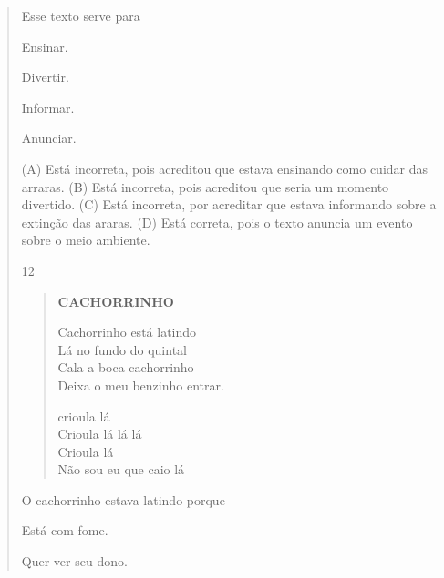 \begin{verse}
Esse texto serve para

\begin{minipage}{.5\textwidth}
\begin{escolha}
\item Ensinar.

\item Divertir.

\item Informar.

\item Anunciar.
\end{escolha}
\end{minipage}

(A) Está incorreta, pois acreditou que estava ensinando como cuidar das arraras.
(B) Está incorreta, pois acreditou que seria um momento divertido.
(C) Está incorreta, por acreditar que estava informando sobre a extinção das araras.
(D) Está correta, pois o texto anuncia um evento sobre o meio ambiente.

\num{12}

\begin{verse}
\textbf{CACHORRINHO}

Cachorrinho está latindo\\
Lá no fundo do quintal\\
Cala a boca cachorrinho\\
Deixa o meu benzinho entrar.

crioula lá\\
Crioula lá lá lá\\
Crioula lá\\
Não sou eu que caio lá
\end{verse}


O cachorrinho estava latindo porque

\begin{escolha}
\item Está com fome.

\item Quer ver seu dono.


\end{escolha}
\end{verse}
